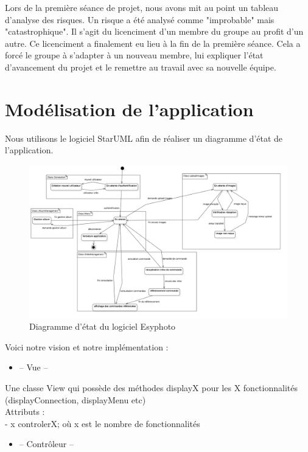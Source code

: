 \documentclass{article}
\begin{document}
\begin{flushleft}
Lors de la première séance de projet, nous avons mit au point un tableau
d'analyse des risques. Un risque a été analysé comme "improbable" mais
"catastrophique". Il s'agit du licenciment d'un membre du groupe au profit
d'un autre. Ce licenciment a finalement eu lieu à la fin de la première
séance. Cela a forcé le groupe à s'adapter à un nouveau membre, lui
expliquer l'état d'avancement du projet et le remettre au travail avec sa
nouvelle équipe.

\newpage
\section{Modélisation de l'application}

Nous utilisons le logiciel StarUML afin de réaliser un diagramme d'état
de l'application.

\begin{figure}[h]
  \begin{center}
    \includegraphics[scale=0.3]{fig2} %
    \caption{Diagramme d'état du logiciel Esyphoto}
  \end{center}
\end{figure}

Voici notre vision et notre implémentation : \\
\vspace{1\baselineskip}
\begin{itemize}
  \item -- Vue --
\end{itemize}



Une classe View qui possède des méthodes displayX pour les X fonctionnalités
(displayConnection, displayMenu etc)\\
Attributs :\\
- x controlerX; où x est le nombre de fonctionnalités
\vspace{1\baselineskip}
\begin{itemize}
  \item -- Contrôleur --
\end{itemize}



\end{flushleft}
\end{document}
